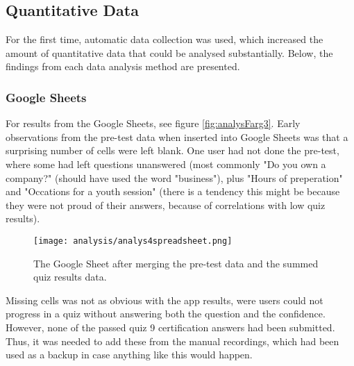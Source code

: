 \subsection{Quantitative Data}






For the first time, automatic data collection was used, which increased the amount of quantitative data that could be analysed substantially. Below, the findings from each data analysis method are presented.

\subsubsection{Google Sheets}
For results from the Google Sheets, see figure \ref{fig:analysFarg3}. Early observations from the pre-test data when inserted into Google Sheets was that a surprising number of cells were left blank. One user had not done the pre-test, where some had left questions unanswered (most commonly "Do you own a company?" (should have used the word "business"), plus "Hours of preperation" and "Occations for a youth session" (there is a tendency this might be because they were not proud of their answers, because of correlations with low quiz results).

\begin{figure}[h]
    \centering
    \texttt{[image: analysis/analys4spreadsheet.png]}
    \caption{The Google Sheet after merging the pre-test data and the summed quiz results data.}
    \label{fig:analys4spreadsheet}
\end{figure}

Missing cells was not as obvious with the app results, were users could not progress in a quiz without answering both the question and the confidence. However, none of the passed quiz 9 certification answers had been submitted. Thus, it was needed to add these from the manual recordings, which had been used as a backup in case anything like this would happen.

